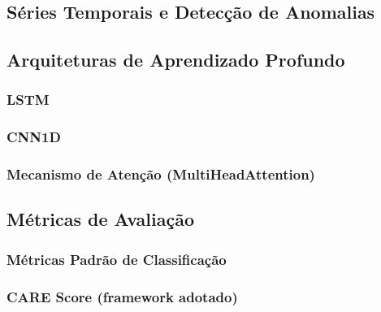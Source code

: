 \documentclass[12pt,a4paper]{article}
\begin{document}
\subsection{Séries Temporais e Detecção de Anomalias}

\subsection{Arquiteturas de Aprendizado Profundo}

\subsubsection{LSTM}


\subsubsection{CNN1D}


\subsubsection{Mecanismo de Atenção (MultiHeadAttention)}


\subsection{Métricas de Avaliação}

\subsubsection{Métricas Padrão de Classificação}

\subsubsection{CARE Score (framework adotado)}
\end{document}
